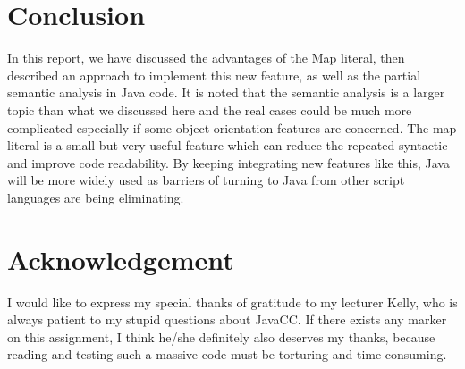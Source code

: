 	\section{Conclusion}
	In this report, we have discussed the advantages of the Map literal, then described an approach to implement this new feature, as well as the partial semantic analysis in Java code. It is noted that the semantic analysis is a larger topic than what we discussed here and the real cases could be much more complicated especially if some object-orientation features are concerned. The map literal is a small but very useful feature which can reduce the repeated syntactic and improve code readability. By keeping integrating new features like this, Java will be more widely used as  barriers of turning to Java from other script languages are being eliminating.
	
	
	
	\section*{Acknowledgement}
	
	I would like to express my special thanks of gratitude to my lecturer Kelly, who is always patient to my stupid questions about JavaCC. If there exists any marker on this assignment, I think he/she definitely also deserves my thanks, because reading and testing such a massive code must be torturing and time-consuming.
	
	\ifCLASSOPTIONcaptionsoff
	\newpage
	\fi
	
	
	
	
	
